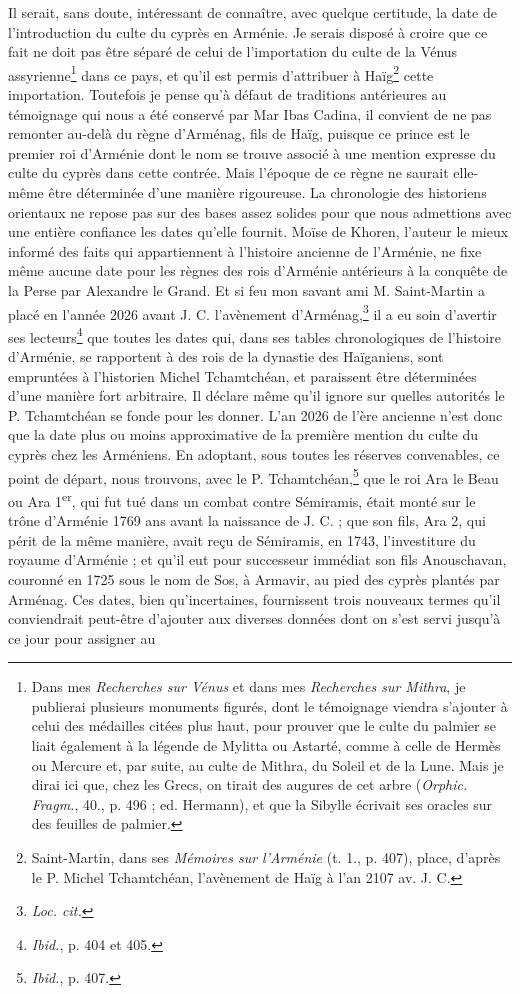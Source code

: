 \documentclass[a4paper, 11pt, oneside, polutonikogreek, french]{article}
\begin{document}
Il serait, sans doute, intéressant de connaître, avec quelque certitude, la date de l'introduction du culte du cyprès en Arménie. Je serais disposé à croire que ce fait ne doit pas être séparé de celui de l'importation du culte de la Vénus assyrienne\footnote{Dans mes \emph{Recherches sur Vénus} et dans mes \emph{Recherches sur Mithra}, je publierai plusieurs monuments figurés, dont le témoignage viendra s'ajouter à celui des médailles citées plus haut, pour prouver que le culte du palmier se liait également à la légende de Mylitta ou Astarté, comme à celle de Hermès ou Mercure et, par suite, au culte de Mithra, du Soleil et de la Lune. Mais je dirai ici que, chez les Grecs, on tirait des augures de cet arbre (\emph{Orphic. Fragm.}, 40., p. 496 ; ed. Hermann), et que la Sibylle écrivait ses oracles sur des feuilles de palmier.} dans ce pays, et qu'il est permis d'attribuer à Haïg\footnote{Saint-Martin, dans ses \emph{Mémoires sur l'Arménie} (t. 1., p. 407), place, d'après le P. Michel Tchamtchéan, l'avènement de Haïg à l'an 2107 av. J. C.} cette importation. Toutefois je pense qu'à défaut de traditions antérieures au témoignage qui nous a été conservé par Mar Ibas Cadina, il convient de ne pas remonter au-delà du règne d'Arménag, fils de Haïg, puisque ce prince est le premier roi d'Arménie dont le nom se trouve associé à une mention expresse du culte du cyprès dans cette contrée. Mais l'époque de ce règne ne saurait elle-même être déterminée d'une manière rigoureuse. La chronologie des historiens orientaux ne repose pas sur des bases assez solides pour que nous admettions avec une entière confiance les dates qu'elle fournit. Moïse de Khoren, l'auteur le mieux informé des faits qui appartiennent à l'histoire ancienne de l'Arménie, ne fixe même aucune date pour les règnes des rois d'Arménie antérieurs à la conquête de la Perse par Alexandre le Grand. Et si feu mon savant ami M. Saint-Martin a placé en l'année 2026 avant J. C. l'avènement d'Arménag,\footnote{\emph{Loc. cit.}} il a eu soin d'avertir ses lecteurs\footnote{\emph{Ibid.}, p. 404 et 405.} que toutes les dates qui, dans ses tables chronologiques de l'histoire d'Arménie, se rapportent à des rois de la dynastie des Haïganiens, sont empruntées à l'historien Michel Tchamtchéan, et paraissent être déterminées d'une manière fort arbitraire. Il déclare même qu'il ignore sur quelles autorités le P. Tchamtchéan se fonde pour les donner. L'an 2026 de l'ère ancienne n'est donc que la date plus ou moins approximative de la première mention du culte du cyprès chez les Arméniens. En adoptant, sous toutes les réserves convenables, ce point de départ, nous trouvons, avec le P. Tchamtchéan,\footnote{\emph{Ibid.}, p. 407.} que le roi Ara le Beau ou Ara 1\textsuperscript{er}, qui fut tué dans un combat contre Sémiramis, était monté sur le trône d'Arménie 1769 ans avant la naissance de J. C. ; que son fils, Ara 2, qui périt de la même manière, avait reçu de Sémiramis, en 1743, l'investiture du royaume d'Arménie ; et qu'il eut pour successeur immédiat son fils Anouschavan, couronné en 1725 sous le nom de Sos, à Armavir, au pied des cyprès plantés par Arménag. Ces dates, bien qu'incertaines, fournissent trois nouveaux termes qu'il conviendrait peut-être d'ajouter aux diverses données dont on s'est servi jusqu'à ce jour pour assigner au 
\end{document}
